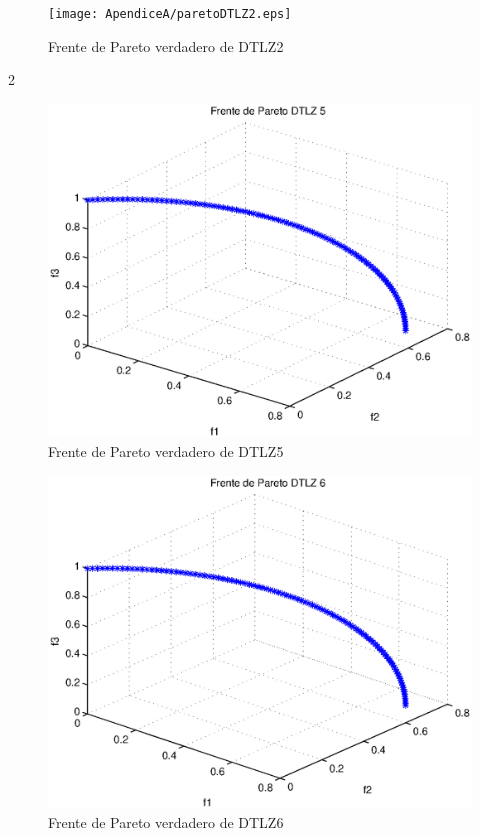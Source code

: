 \begin{figure}
    \centering
    \texttt{[image: ApendiceA/paretoDTLZ2.eps]}
    \caption{Frente de Pareto verdadero de DTLZ2}
    \label{fig:dtlz2}
\end{figure}
2\begin{figure}
    \centering
    \includegraphics[scale=0.7]{ApendiceA/paretoDTLZ5.eps}
    \caption{Frente de Pareto verdadero de DTLZ5}
    \label{fig:dtlz5}
\end{figure}
\begin{figure}
  \centering
    \includegraphics[scale=0.7]{ApendiceA/paretoDTLZ6.eps}
    \caption{Frente de Pareto verdadero de DTLZ6}
   \label{fig:dtlz6}
\end{figure}
